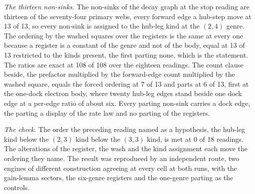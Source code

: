 \begin{chproof}
\textit{The thirteen non-sinks.} The non-sinks of the decay graph at the stop reading are thirteen of the seventy-four primary webs, every forward edge a hub-step move at 13 of 13, so every non-sink is assigned to the hub-leg kind at the $(2,4)$ genre. The ordering by the washed squares over the registers is the same at every one because a register is a constant of the genre and not of the body, equal at 13 of 13 restricted to the kinds present, the first parting none, which is the statement. The ratios are exact at 108 of 108 over the eighteen readings. The count clause beside, the prefactor multiplied by the forward-edge count multiplied by the washed square, equals the forced ordering at 7 of 13 and parts at 6 of 13, first at the one-dock electron body, where twenty hub-leg edges stand beside one dock edge at a per-edge ratio of about six. Every parting non-sink carries a dock edge, the parting a display of the rate law and no parting of the registers.

\textit{The check.} The order the preceding reading named as a hypothesis, the hub-leg kind below the $(2,3)$ kind below the $(3,3)$ kind, is met at 0 of 18 readings. The alterations of the register, the wash and the kind assignment each move the ordering they name. The result was reproduced by an independent route, two engines of different construction agreeing at every cell at both runs, with the gain-lemma sectors, the six-genre registers and the one-genre parting as the controls.
\end{chproof}
